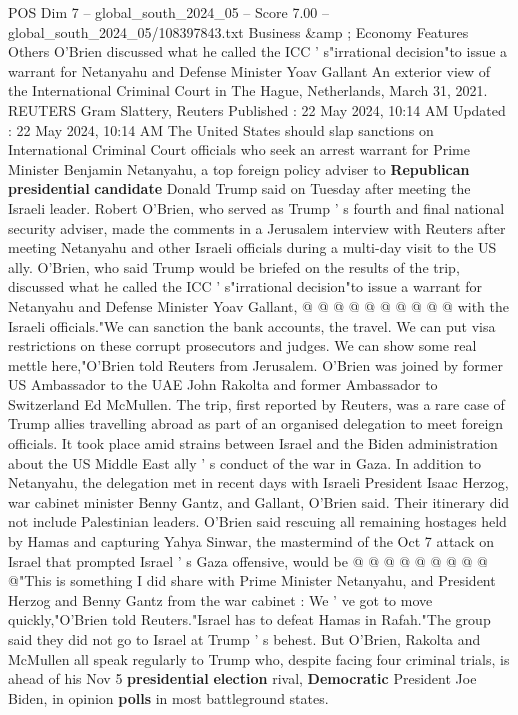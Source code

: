 \begin{textsample}{POS Dim 7 – global\_south\_2024\_05 – Score 7.00 – global\_south\_2024\_05/108397843.txt}  \label{ex:f7_pos_211}
Business \&amp ; Economy Features Others O'Brien discussed what he called the ICC ' s"irrational decision"to issue a warrant for Netanyahu and Defense Minister Yoav Gallant An exterior view of the International Criminal Court in The Hague, Netherlands, March 31, 2021.
REUTERS Gram Slattery, Reuters Published : 22 May 2024, 10:14 AM Updated : 22 May 2024, 10:14 AM The United States should slap sanctions on International Criminal Court officials who seek an arrest warrant for Prime Minister Benjamin Netanyahu, a top foreign policy adviser to \textbf{Republican} \textbf{presidential} \textbf{candidate} Donald Trump said on Tuesday after meeting the Israeli leader.
Robert O'Brien, who served as Trump ' s fourth and final national security adviser, made the comments in a Jerusalem interview with Reuters after meeting Netanyahu and other Israeli officials during a multi-day visit to the US ally.
O'Brien, who said Trump would be briefed on the results of the trip, discussed what he called the ICC ' s"irrational decision"to issue a warrant for Netanyahu and Defense Minister Yoav Gallant, @ @ @ @ @ @ @ @ @ @ with the Israeli officials."We can sanction the bank accounts, the travel.
We can put visa restrictions on these corrupt prosecutors and judges.
We can show some real mettle here,"O'Brien told Reuters from Jerusalem.
O'Brien was joined by former US Ambassador to the UAE John Rakolta and former Ambassador to Switzerland Ed McMullen.
The trip, first reported by Reuters, was a rare case of Trump allies travelling abroad as part of an organised delegation to meet foreign officials.
It took place amid strains between Israel and the Biden administration about the US Middle East ally ' s conduct of the war in Gaza.
In addition to Netanyahu, the delegation met in recent days with Israeli President Isaac Herzog, war cabinet minister Benny Gantz, and Gallant, O'Brien said.
Their itinerary did not include Palestinian leaders.
O'Brien said rescuing all remaining hostages held by Hamas and capturing Yahya Sinwar, the mastermind of the Oct 7 attack on Israel that prompted Israel ' s Gaza offensive, would be @ @ @ @ @ @ @ @ @ @"This is something I did share with Prime Minister Netanyahu, and President Herzog and Benny Gantz from the war cabinet : We ' ve got to move quickly,"O'Brien told Reuters."Israel has to defeat Hamas in Rafah."The group said they did not go to Israel at Trump ' s behest.
But O'Brien, Rakolta and McMullen all speak regularly to Trump who, despite facing four criminal trials, is ahead of his Nov 5 \textbf{presidential} \textbf{election} rival, \textbf{Democratic} President Joe Biden, in opinion \textbf{polls} in most battleground states.

\end{textsample}
